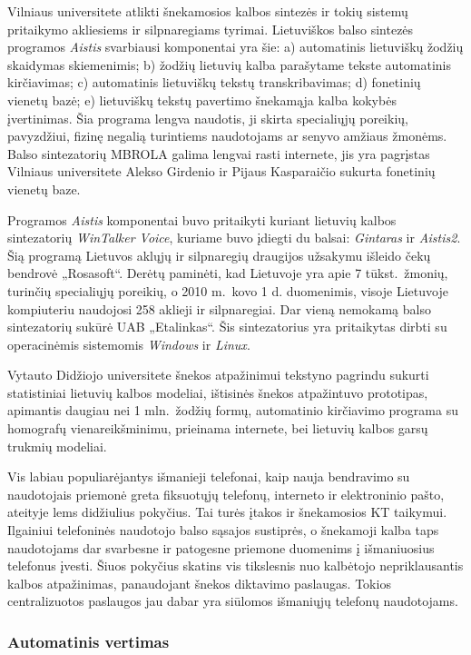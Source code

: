 \begin{multicols}{2}
    Vilniaus universitete atlikti šnekamosios kalbos sintezės ir tokių sistemų pritaikymo akliesiems ir silpnaregiams tyrimai. Lietuviškos balso sintezės programos \textit{Aistis} svarbiausi komponentai yra šie: a) automatinis lietuviškų žodžių skaidymas skiemenimis; b) žodžių lietuvių kalba parašytame tekste automatinis kirčiavimas; c) automatinis lietuviškų tekstų transkribavimas; d) fonetinių vienetų bazė; e) lietuviškų tekstų pavertimo šnekamąja kalba kokybės įvertinimas. Šia programa lengva naudotis, ji skirta specialiųjų poreikių, pavyzdžiui, fizinę negalią turintiems naudotojams ar senyvo amžiaus žmonėms. Balso sintezatorių MBROLA galima lengvai rasti internete, jis yra pagrįstas Vilniaus universitete Alekso Girdenio ir Pijaus Kasparaičio sukurta fonetinių vienetų baze.   

    Programos \textit{Aistis}  komponentai buvo pritaikyti kuriant lietuvių kalbos sintezatorių \textit{WinTalker Voice}, kuriame buvo įdiegti du balsai: \textit{Gintaras}  ir \textit{Aistis2}. Šią programą Lietuvos aklųjų ir silpnaregių draugijos užsakymu išleido čekų bendrovė „Rosasoft“. Derėtų paminėti, kad Lietuvoje yra apie 7 tūkst.~žmonių, turinčių specialiųjų poreikių, o 2010 m.~kovo 1 d. duomenimis, visoje Lietuvoje kompiuteriu naudojosi 258 aklieji ir silpnaregiai. Dar vieną nemokamą balso sintezatorių sukūrė UAB „Etalinkas“.  Šis sintezatorius yra pritaikytas dirbti su operacinėmis sistemomis \textit{Windows} ir \textit{Linux}.

Vytauto Didžiojo universitete šnekos atpažinimui tekstyno pagrindu sukurti statistiniai lietuvių kalbos modeliai, ištisinės šnekos atpažintuvo prototipas, apimantis daugiau nei 1 mln.~žodžių formų, automatinio kirčiavimo programa su homografų vienareikšminimu, prieinama internete, bei lietuvių kalbos garsų trukmių modeliai.

Vis labiau populiarėjantys išmanieji telefonai, kaip nauja bendravimo su naudotojais priemonė greta fiksuotųjų telefonų, interneto ir elektroninio pašto, ateityje lems didžiulius pokyčius. Tai turės įtakos ir šnekamosios KT taikymui. Ilgainiui telefoninės naudotojo balso sąsajos sustiprės, o šnekamoji kalba taps naudotojams dar svarbesne ir patogesne priemone duomenims į išmaniuosius telefonus įvesti. Šiuos pokyčius skatins vis tikslesnis nuo kalbėtojo nepriklausantis kalbos atpažinimas, panaudojant šnekos diktavimo paslaugas. Tokios centralizuotos paslaugos jau dabar yra siūlomos išmaniųjų telefonų naudotojams.

\subsubsection{Automatinis vertimas}


\end{multicols}
